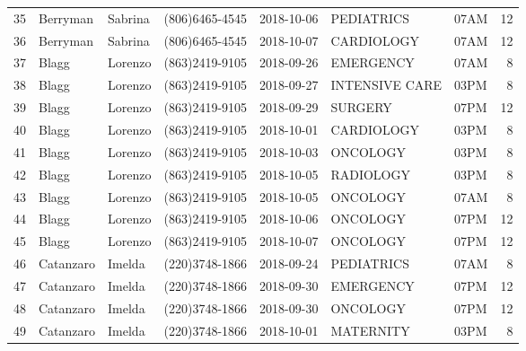 \documentclass[11pt]{article}
\begin{document}
\begin{tabular}{lllllllr}
	35 &   Berryman &  Sabrina &  (806)6465-4545 &  2018-10-06 &      PEDIATRICS &  07AM &            12 \\
	36 &   Berryman &  Sabrina &  (806)6465-4545 &  2018-10-07 &      CARDIOLOGY &  07AM &            12 \\
	37 &      Blagg &  Lorenzo &  (863)2419-9105 &  2018-09-26 &       EMERGENCY &  07AM &             8 \\
	38 &      Blagg &  Lorenzo &  (863)2419-9105 &  2018-09-27 &  INTENSIVE CARE &  03PM &             8 \\
	39 &      Blagg &  Lorenzo &  (863)2419-9105 &  2018-09-29 &         SURGERY &  07PM &            12 \\
	40 &      Blagg &  Lorenzo &  (863)2419-9105 &  2018-10-01 &      CARDIOLOGY &  03PM &             8 \\
	41 &      Blagg &  Lorenzo &  (863)2419-9105 &  2018-10-03 &        ONCOLOGY &  03PM &             8 \\
	42 &      Blagg &  Lorenzo &  (863)2419-9105 &  2018-10-05 &       RADIOLOGY &  03PM &             8 \\
	43 &      Blagg &  Lorenzo &  (863)2419-9105 &  2018-10-05 &        ONCOLOGY &  07AM &             8 \\
	44 &      Blagg &  Lorenzo &  (863)2419-9105 &  2018-10-06 &        ONCOLOGY &  07PM &            12 \\
	45 &      Blagg &  Lorenzo &  (863)2419-9105 &  2018-10-07 &        ONCOLOGY &  07PM &            12 \\
	46 &  Catanzaro &   Imelda &  (220)3748-1866 &  2018-09-24 &      PEDIATRICS &  07AM &             8 \\
	47 &  Catanzaro &   Imelda &  (220)3748-1866 &  2018-09-30 &       EMERGENCY &  07PM &            12 \\
	48 &  Catanzaro &   Imelda &  (220)3748-1866 &  2018-09-30 &        ONCOLOGY &  07PM &            12 \\
	49 &  Catanzaro &   Imelda &  (220)3748-1866 &  2018-10-01 &       MATERNITY &  03PM &             8 \\
	\bottomrule
\end{tabular}


    
    
    
    
\end{document}
